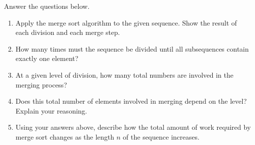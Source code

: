 \documentclass[twoside, 10pt]{article}
\begin{document}
Answer the questions below.

\begin{enumerate}[label=\arabic*.]
    \item Apply the merge sort algorithm to the given sequence.  
    Show the result of each division and each merge step.
    \clearpage
    \item How many times must the sequence be divided until all subsequences contain exactly one element?
    \item At a given level of division, how many total numbers are involved in the merging process?
    \item Does this total number of elements involved in merging depend on the level?  
    Explain your reasoning.
    \item Using your answers above, describe how the total amount of work required by merge sort changes as the length \(n\) of the sequence increases.
\end{enumerate}
\end{document}
